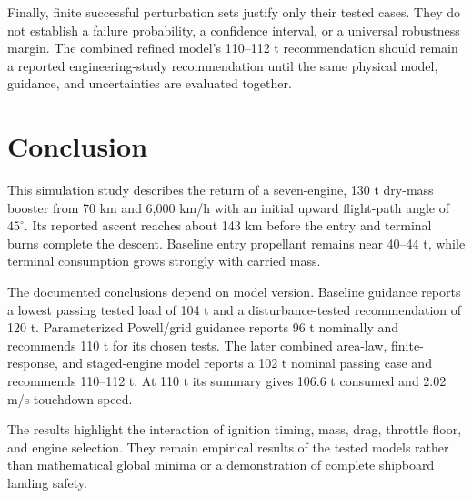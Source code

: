 \documentclass[11pt,a4paper]{article}
\begin{document}
Finally, finite successful perturbation sets justify only their tested cases. They do not establish a failure probability, a confidence interval, or a universal robustness margin. The combined refined model's 110--112 t recommendation should remain a reported engineering-study recommendation until the same physical model, guidance, and uncertainties are evaluated together.

\section{Conclusion}
This simulation study describes the return of a seven-engine, 130 t dry-mass booster from 70 km and 6,000 km/h with an initial upward flight-path angle of $45^\circ$. Its reported ascent reaches about 143 km before the entry and terminal burns complete the descent. Baseline entry propellant remains near 40--44 t, while terminal consumption grows strongly with carried mass.

The documented conclusions depend on model version. Baseline guidance reports a lowest passing tested load of 104 t and a disturbance-tested recommendation of 120 t. Parameterized Powell/grid guidance reports 96 t nominally and recommends 110 t for its chosen tests. The later combined area-law, finite-response, and staged-engine model reports a 102 t nominal passing case and recommends 110--112 t. At 110 t its summary gives 106.6 t consumed and 2.02 m/s touchdown speed.

The results highlight the interaction of ignition timing, mass, drag, throttle floor, and engine selection. They remain empirical results of the tested models rather than mathematical global minima or a demonstration of complete shipboard landing safety.

\clearpage

\end{document}
